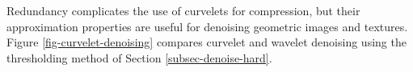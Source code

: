 Redundancy complicates the use of curvelets for compression, but their approximation properties are useful for denoising geometric images and textures. Figure \ref{fig-curvelet-denoising} compares curvelet and wavelet denoising using the thresholding method of Section \ref{subsec-denoise-hard}.








